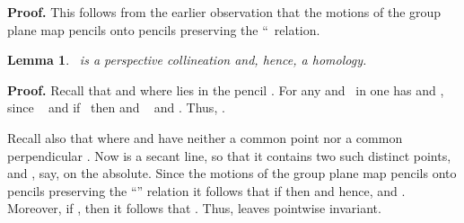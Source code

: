 \documentclass[a4paper,twoside,12pt]{article}
\newtheorem{lemma}{Lemma}[section]
\newenvironment{proof}{\medskip \noindent 
            {\bf Proof.}}{ \hfill \myHighlight{$\square$}\coordHE{} \medskip}
\begin{document}
\begin{proof} This follows from the earlier observation that the motions
of the group plane map pencils onto pencils preserving the ``\coordHE{}\ relation.
\end{proof}

\begin{lemma} \coordHE{}\ is a perspective collineation and, hence, a
homology.
\end{lemma}

\begin{proof} Recall that \coordHE{}  \coordHE{}
and where \coordHE{} lies in the pencil \coordHE{}. For any \coordHE{}
and \coordHE{}\ in \coordHE{} one has \coordHE{} and \coordHE{}, since \coordHE{}\ \coordHE{}
and if \coordHE{}\ then 
\coordHE{} and \coordHE{}\ \coordHE{} and 
\coordHE{}. Thus, \coordHE{}.

   Recall also that \coordHE{}
where \coordHE{} and \coordHE{} have neither a common point nor a common perpendicular \myHighlight{$\}$}\coordHE{}. 
Now \coordHE{} is a secant line, so that it contains two such distinct points, 
\coordHE{} and \coordHE{}, say, on the absolute. Since the
motions of the group plane map pencils onto pencils preserving the ``\myHighlight{$|$}\coordHE{}''
relation it follows that if \coordHE{} then 
\coordHE{} and hence, 
\coordHE{} and \coordHE{}.
Moreover, if \coordHE{}, then it follows that 
\coordHE{}. Thus, \coordHE{} leaves \coordHE{}
pointwise invariant.


\end{proof}
\end{document}
